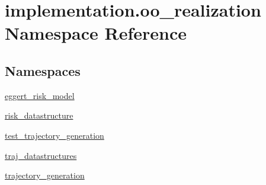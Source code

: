 \hypertarget{namespaceimplementation_1_1oo__realization}{}\section{implementation.\+oo\+\_\+realization Namespace Reference}
\label{namespaceimplementation_1_1oo__realization}
\subsection*{Namespaces}
\begin{DoxyCompactItemize}
\item 
 \hyperlink{namespaceimplementation_1_1oo__realization_1_1eggert__risk__model}{eggert\+\_\+risk\+\_\+model}
\item 
 \hyperlink{namespaceimplementation_1_1oo__realization_1_1risk__datastructure}{risk\+\_\+datastructure}
\item 
 \hyperlink{namespaceimplementation_1_1oo__realization_1_1test__trajectory__generation}{test\+\_\+trajectory\+\_\+generation}
\item 
 \hyperlink{namespaceimplementation_1_1oo__realization_1_1traj__datastructures}{traj\+\_\+datastructures}
\item 
 \hyperlink{namespaceimplementation_1_1oo__realization_1_1trajectory__generation}{trajectory\+\_\+generation}
\end{DoxyCompactItemize}

